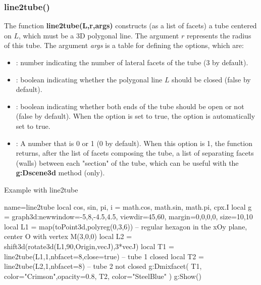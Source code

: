 \subsubsection{line2tube()}
The function \textbf{line2tube(L,r,args)} constructs (as a list of facets) a tube centered on $L$, which must be a 3D polygonal line. The argument $r$ represents the radius of this tube. The argument \emph{args} is a table for defining the options, which are:
\begin{itemize}
    \item {}: number indicating the number of lateral facets of the tube (3 by default).
    \item {}: boolean indicating whether the polygonal line $L$ should be closed (false by default).
    \item {}: boolean indicating whether both ends of the tube should be open or not (false by default). When the  option is set to true, the  option is automatically set to true.     \item {}: A number that is 0 or 1 (0 by default). When this option is 1, the function returns, after the list of facets composing the tube, a list of separating facets (walls) between each "section" of the tube, which can be useful with the \textbf{g:Dscene3d} method (only).
\end{itemize}

\begin{demo}{Example with line2tube}
\begin{luadraw}{name=line2tube}
local cos, sin, pi, i = math.cos, math.sin, math.pi, cpx.I
local g = graph3d:new{window={-5,8,-4.5,4.5}, viewdir={45,60}, margin={0,0,0,0}, size={10,10}}
local L1 = map(toPoint3d,polyreg(0,3,6)) -- regular hexagon in the xOy plane, center O with vertex M(3,0,0)
local L2 = shift3d(rotate3d(L1,90,{Origin,vecJ}),3*vecJ)
local T1 = line2tube(L1,1,{nbfacet=8,close=true}) -- tube 1 closed
local T2 = line2tube(L2,1,{nbfacet=8})  -- tube 2 not closed
g:Dmixfacet( T1, {color="Crimson",opacity=0.8}, T2, {color="SteelBlue"} )
g:Show()
\end{luadraw}
\end{demo}

